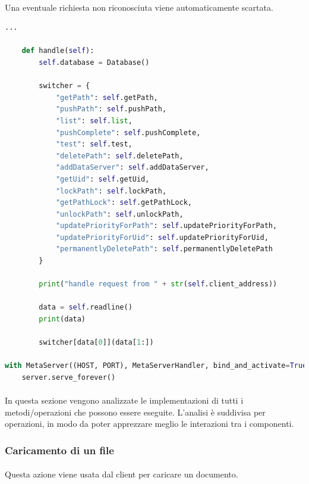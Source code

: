 \documentclass{article}
\begin{document}
\paragraph{} Una eventuale richiesta non riconosciuta viene automaticamente scartata.

\begin{lstlisting}[language=Python, title=Metaserver e relativo handler]
    ...
    
    def handle(self):
        self.database = Database()

        switcher = {
            "getPath": self.getPath,
            "pushPath": self.pushPath,
            "list": self.list,
            "pushComplete": self.pushComplete,
            "test": self.test,
            "deletePath": self.deletePath,
            "addDataServer": self.addDataServer,
            "getUid": self.getUid,
            "lockPath": self.lockPath,
            "getPathLock": self.getPathLock,
            "unlockPath": self.unlockPath,
            "updatePriorityForPath": self.updatePriorityForPath,
            "updatePriorityForUid": self.updatePriorityForUid,
            "permanentlyDeletePath": self.permanentlyDeletePath
        }

        print("handle request from " + str(self.client_address))

        data = self.readline()
        print(data)

        switcher[data[0]](data[1:])

with MetaServer((HOST, PORT), MetaServerHandler, bind_and_activate=True) as server:
    server.serve_forever()
\end{lstlisting}

\paragraph{} In questa sezione vengono analizzate le implementazioni di tutti i metodi/operazioni che possono essere eseguite. L'analisi è suddivisa per operazioni, in modo da poter apprezzare meglio le interazioni tra i componenti. 

\subsubsection{Caricamento di un file}

\paragraph{} Questa azione viene usata dal client per caricare un documento.
\end{document}
